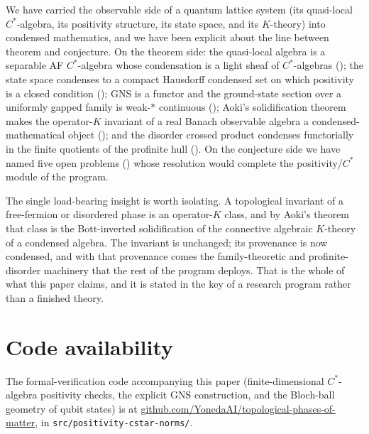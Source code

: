 \documentclass[12pt]{article}
\theoremstyle{plain}
\begin{document}
We have carried the observable side of a quantum lattice system (its quasi-local
$C^{*}$-algebra, its positivity structure, its state space, and its $K$-theory)
into condensed mathematics, and we have been explicit about the line between theorem
and conjecture. On the theorem side: the quasi-local algebra is a separable AF
$C^{*}$-algebra whose condensation is a light sheaf of $C^{*}$-algebras
(); the state space condenses to a compact Hausdorff
condensed set on which positivity is a closed condition (); GNS
is a functor and the ground-state section over a uniformly gapped family is
weak-$\ast$ continuous (); Aoki's solidification
theorem makes the operator-$K$ invariant of a real Banach observable algebra a
condensed-mathematical object (); and the disorder
crossed product condenses functorially in the finite quotients of the profinite hull
(). On the conjecture side we have named five open
problems ()
whose resolution would complete the positivity/$C^{*}$ module of the program.

The single load-bearing insight is worth isolating. A topological invariant of a
free-fermion or disordered phase is an operator-$K$ class, and by Aoki's theorem that
class is the Bott-inverted solidification of the connective algebraic $K$-theory of a
condensed algebra. The invariant is unchanged; its provenance is now condensed, and
with that provenance comes the family-theoretic and profinite-disorder machinery that
the rest of the program deploys. That is the whole of what this paper claims, and it
is stated in the key of a research program rather than a finished theory.

\section*{Code availability}
The formal-verification code accompanying this paper (finite-dimensional
$C^{*}$-algebra positivity checks, the explicit GNS construction, and the Bloch-ball
geometry of qubit states) is at
\href{https://github.com/YonedaAI/topological-phases-of-matter}{github.com/YonedaAI/topological-phases-of-matter},
in \texttt{src/positivity-cstar-norms/}.
\end{document}
